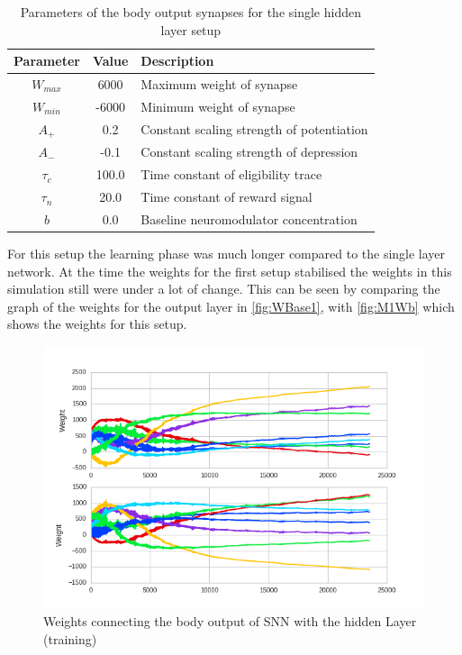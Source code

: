   \begin{table}[htpb]
  \centering
  \caption[Parameters Single Hidden Layer]{Parameters of the body output synapses for the single hidden layer setup} \label{tab:M1SynOb}
    \begin{tabular}{|c| c |l|}
        \toprule
        Parameter  & Value & Description \\
        \midrule
        $W_{max}$ & 6000   & Maximum weight of synapse\\   
        $W_{min}$ & -6000  & Minimum weight of synapse\\   
        $A_{+}$   & 0.2    & Constant scaling strength of potentiation\\   
        $A_{-}$   & -0.1   & Constant scaling strength of depression \\   
        $\tau_c$  & 100.0   & Time constant of eligibility trace \\  
        $\tau_n$  & 20.0   & Time constant of reward signal  \\   
        $b$       & 0.0    & Baseline neuromodulator concentration \\    
        \bottomrule
    \end{tabular}
  \end{table}
For this setup the learning phase was much longer compared to the single layer network. At the time the weights for the first setup stabilised the weights in this simulation still were under a lot of change. This can be seen by comparing the graph of the weights for the output layer in \autoref{fig:WBase1}, with \autoref{fig:M1Wb} which shows the weights for this setup.
\begin{figure}[htpb]
  \centering
  \includegraphics[width=\textwidth]{figures/plots/newPlots/m1Train_bodyW}%
  \caption{ Weights connecting the body output of SNN with the hidden Layer (training)  }
  \label{fig:M1Wb}
\end{figure}

